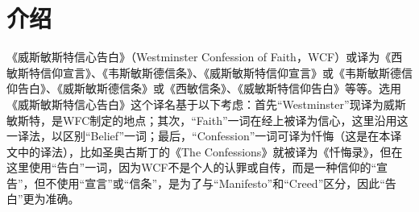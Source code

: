 \documentclass[12pt, a4paper, oneside]{ctexart}
\begin{document}
\begin{abstract}
	这是本人归信基督后开展的第一项工作。这个工作不是我的“本职”工作。我所学并非神学，也非从事专业翻译工作。但作为理工专业出身，我更明白我所学所受皆源自祂。而本人也刚开始领受上帝的话语，对圣经研读知之甚少。正因如此，我明白自己是灵里贫困的人，而无比渴望得到上帝的言，急切需要祂的话语来荡涤我这罪人的心。何况我从祂那领受了一颗无伪的真心，这让我有无可辩驳与推卸的责任，要将的祂的话由这颗心倾吐出来，以作为对祂的见证。

	本人翻译《威斯敏斯特信心告白》一方面希望从中获得对上帝、对信仰更深的认识，另一方面希望通过翻译将上帝的旨意更准确地传递出来。\href{https://www.bible.world/%E5%A8%81%E6%96%AF%E6%95%8F%E6%96%AF%E7%89%B9%E4%BF%A1%E6%9D%A1}{《威斯敏斯特信心告白》}已有多个汉译版本，但他们的翻译更倾向于意译，而原文诸多意思在译文中并未完全反映，或有所偏差。而这一问题在中译《圣经》中同样存在。为此，在翻译中我采用直译的方法，而且不仅对《威斯敏斯特信心告白》进行翻译，也对注解引到的经文进行翻译。限于本人能力，经文暂按英文译本进行翻译，力图呈现原意，以使得《威斯敏斯特信心告白》翻译更完整，而自成一体。
	
	翻译本身也是一个系统工程，需要不断地迭代不断纠错，才能向祂的真理不断靠近。我将此工作在网上开源，期盼同工一起使此译本能得到不断完善。这项工作也仅仅是一个开始，一个基础，为后续体系的翻译做好准备和铺垫。自己的工作只是属世的职业，而为祂工作才是永永远远。
	
	我这样的罪人能得蒙主的救赎，无论怎么做，做多少都亏欠于祂。而万一此工作有幸有人看到并认识主，跟从主，归向主，这也是对亏欠莫大的安慰。当然这一切都仰仗主亲自的教导与带领，没有主的同在，我什么也不是，更是什么都做不了。求主宽恕我这个罪人，带领真心跟从祢的仆人，使他心中所想，手中所写能合乎祢的心意，愿祢的意志在地如在天！阿门。
	
	\hfill Job Zhao

	\hfill 2023年12月24日
    
\end{abstract}

\newpage
{}
\setcounter{page}{1}
\tableofcontents
\newpage
\setcounter{page}{1}

\section*{介绍}

《威斯敏斯特信心告白》（Westminster Confession of Faith，WCF）或译为《西敏斯特信仰宣言》、《韦斯敏斯德信条》、《威斯敏斯特信仰宣言》或《韦斯敏斯德信仰告白》、《威斯敏斯德信条》或《西敏信条》、《威敏斯特信仰告白》等等。选用《威斯敏斯特信心告白》这个译名基于以下考虑：首先“Westminster”现译为威斯敏斯特，是WFC制定的地点；其次，“Faith”一词在经上被译为信心，这里沿用这一译法，以区别“Belief”一词；最后，“Confession”一词可译为忏悔（这是在本译文中的译法），比如圣奥古斯丁的《The Confessions》就被译为《忏悔录》，但在这里使用“告白”一词，因为WCF不是个人的认罪或自传，而是一种信仰的“宣告”，但不使用“宣言”或“信条”，是为了与“Manifesto”和“Creed”区分，因此“告白”更为准确。
\end{document}
